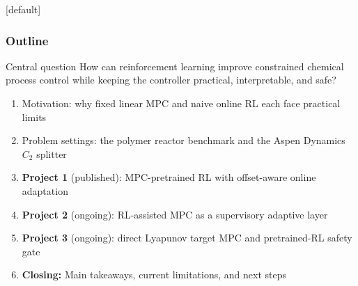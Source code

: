 \documentclass[aspectratio=169]{beamer}
\begin{document}
\begin{frame}
[default]
\frametitle{\large \textbf{Outline}}
\small

\begin{block}{Central question}
\justifying
How can reinforcement learning improve constrained chemical process control while keeping the controller practical, interpretable, and safe?
\end{block}

\vspace{0.08cm}

\begin{enumerate}\justifying
  \setlength\itemsep{0.35ex}

  \item Motivation: why fixed linear MPC and naive online RL each face practical limits

  \item Problem settings: the polymer reactor benchmark and the Aspen Dynamics \(C_2\) splitter

  \item \textbf{Project 1} \textcolor{maccblue}{(published)}: MPC-pretrained RL with offset-aware online adaptation

  \item \textbf{Project 2} \textcolor{maccgreen}{(ongoing)}: RL-assisted MPC as a supervisory adaptive layer

  \item \textbf{Project 3} \textcolor{maccred}{(ongoing)}: direct Lyapunov target MPC and pretrained-RL safety gate

  \item \textbf{Closing:} Main takeaways, current limitations, and next steps

\end{enumerate}

\end{frame}
\end{document}
